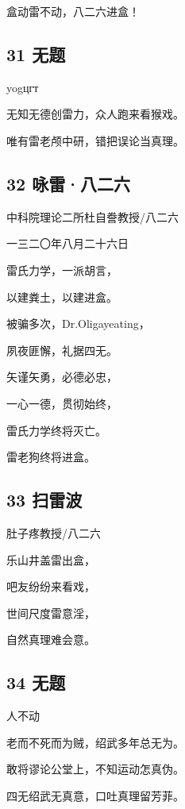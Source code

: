 盒动雷不动，八二六进盒！

\hypertarget{ux65e0ux9898-7}{%
\subsection{31 无题}\label{ux65e0ux9898-7}}

yogцгт

无知无德创雷力，众人跑来看猴戏。

唯有雷老颅中研，错把误论当真理。

\hypertarget{ux548fux96f7ux516bux4e8cux516d}{%
\subsection{32 咏雷·八二六}\label{ux548fux96f7ux516bux4e8cux516d}}

中科院理论二所杜自誊教授/八二六

一三二〇年八月二十六日

雷氏力学，一派胡言，

以建粪土，以建进盒。

被骗多次，Dr.Oligayeating，

夙夜匪懈，礼据四无。

矢谨矢勇，必德必忠，

一心一德，贯彻始终，

雷氏力学终将灭亡。

雷老狗终将进盒。

\hypertarget{ux626bux96f7ux6ce2}{%
\subsection{33 扫雷波}\label{ux626bux96f7ux6ce2}}

肚子疼教授/八二六

乐山井盖雷出盒，

吧友纷纷来看戏，

世间尺度雷意淫，

自然真理难会意。

\hypertarget{ux65e0ux9898-8}{%
\subsection{34 无题}\label{ux65e0ux9898-8}}

人不动

老而不死而为贼，绍武多年总无为。

敢将谬论公堂上，不知运动怎真伪。

四无绍武无真意，口吐真理留芳菲。

